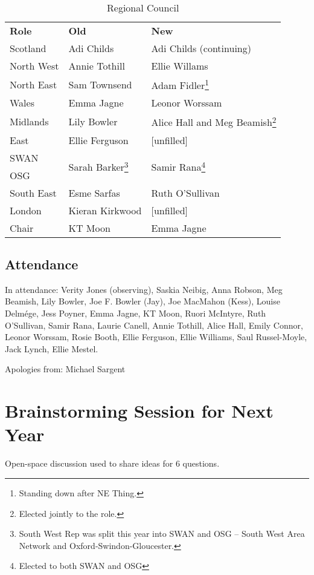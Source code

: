 \documentclass[a4paper, 12pt]{article}
\begin{document}
\begin{savenotes}
\begin{table}[h]
\centering

\begin{tabular}{ l || l | l }
\textbf{Role}	& \textbf{Old}		& \textbf{New} \\
Scotland		& Adi Childs		& Adi Childs (continuing) \\
North West		& Annie Tothill		& Ellie Willams \\
North East		& Sam Townsend		& Adam Fidler\footnote{Standing down after NE Thing.} \\
Wales			& Emma Jagne		& Leonor Worssam \\
Midlands		& Lily Bowler		& Alice Hall and Meg Beamish\footnote{Elected jointly to the role.} \\
East			& Ellie Ferguson	& [unfilled] \\
SWAN			& \multirow{2}{*}{Sarah Barker\footnote{South West Rep was split this year into SWAN and OSG -- South West Area Network and Oxford-Swindon-Gloucester.}} & \multirow{2}{*}{Samir Rana\footnote{Elected to both SWAN and OSG}} \\
OSG				& 					&  \\
South East		& Esme Sarfas		& Ruth O'Sullivan \\
London			& Kieran Kirkwood	& [unfilled] \\
Chair			& KT Moon			& Emma Jagne \\
\end{tabular}
\caption{Regional Council}
\end{table}
\end{savenotes}

\subsection{Attendance}
In attendance: Verity Jones (observing), Saskia Neibig, Anna Robson, Meg Beamish, Lily Bowler, Joe F. Bowler (Jay), Joe MacMahon (Kess), Louise Delmége, Jess Poyner, Emma Jagne, KT Moon, Ruori McIntyre, Ruth O'Sullivan, Samir Rana, Laurie Canell, Annie Tothill, Alice Hall, Emily Connor, Leonor Worssam, Rosie Booth, Ellie Ferguson, Ellie Williams, Saul Russel-Moyle, Jack Lynch, Ellie Mestel.

Apologies from: Michael Sargent

\section{Brainstorming Session for Next Year}
Open-space discussion used to share ideas for 6 questions.
\end{document}
